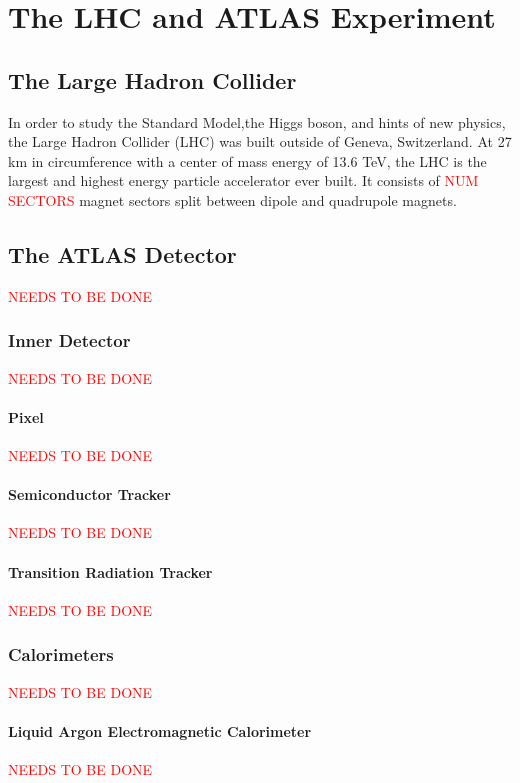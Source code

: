\chapter{The LHC and ATLAS Experiment}

\section{The Large Hadron Collider}{
	In order to study the Standard Model,the Higgs boson, and hints of new physics, the Large Hadron Collider (LHC) was built outside of Geneva, Switzerland. At 27 km in circumference with a center of mass energy of 13.6 TeV, the LHC is the largest and highest energy particle accelerator ever built. It consists of \textcolor{red}{NUM SECTORS} magnet sectors split between dipole and quadrupole magnets.
}
	

\section{The ATLAS Detector}{
	\textcolor{red}{NEEDS TO BE DONE}  ~\cite{atlas-experiment}
}

	\subsection{Inner Detector}{
		\textcolor{red}{NEEDS TO BE DONE}
	}

		\subsubsection{Pixel}{
			\textcolor{red}{NEEDS TO BE DONE}
		}

		\subsubsection{Semiconductor Tracker}{
			\textcolor{red}{NEEDS TO BE DONE}
		}

		\subsubsection{Transition Radiation Tracker}{
			\textcolor{red}{NEEDS TO BE DONE}
		}

	\subsection{Calorimeters}{
		\textcolor{red}{NEEDS TO BE DONE}
	}

		\subsubsection{Liquid Argon Electromagnetic Calorimeter}{
			\textcolor{red}{NEEDS TO BE DONE}
		}

